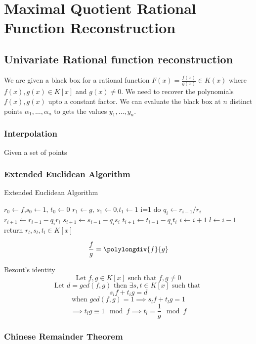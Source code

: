 \chapter{Maximal Quotient Rational Function Reconstruction}
\section{Univariate Rational function reconstruction}
We are given a black box for a rational function $F(x)=\frac{f(x)}{g(x)} \in K(x)$
where $f(x),g(x) \in K[x]$ and $g(x) \neq 0$. We need to recover the polynomials $f(x),g(x)$ upto 
a constant factor.
We can evaluate the black box at $n$ distinct points $\alpha_{1},\dots,\alpha_{n}$ to gets
 the values $y_{1},\dots,y_{n}$.
\subsection{Interpolation}
Given a set of points 

\subsection{Extended Euclidean Algorithm}

\begin{algorithm}
\caption{Extended Euclidean Algorithm}
\begin{algorithmic}[1]
  \State $r_{0} \gets f$,\quad$s_{0} \gets 1$, \quad$t_{0} \gets 0$
  \State $r_{1} \gets g$, \quad $s_{1}\gets 0$,\quad$t_{1} \gets 1$
  \State i=1
   do 
  \State $q_{i} \gets r_{i-1}/r_{i}$
  \State $r_{i+1} \gets r_{i-1}-q_{i}r_{i}$
  \State $s_{i+1} \gets s_{i-1}-q_{i}s_{i}$
  \State $t_{i+1} \gets t_{i-1}-q_{i}t_{i}$
  \State $i \gets i+1$
  \EndWhile
  \State $l \gets  i-1$\\
  return $r_{l},s_{l},t_{l} \in K[x]$
  \end{algorithmic}
\end{algorithm}

\[\frac{f}{g}= \polylongdiv{f}{g}\]
\begin{theorem}Bezout's identity
\[
\text{Let } f,g \in K[x] \text{ such that } f,g \neq 0
\]
\[
\text{Let } d=gcd(f,g) \text{ then } \exists s,t \in K[x] \text{ such that }
\]
\[
s_{i}f+t_{i}g=d
\]
\[
\text{when  }gcd(f,g) = 1 \implies s_{l}f+t_{l}g=1
\]
\[
\implies t_{l}g \equiv 1 \mod f \implies t_{l} = \frac{1}{g} \mod f
\]
\end{theorem}
\subsection{Chinese Remainder Theorem}

